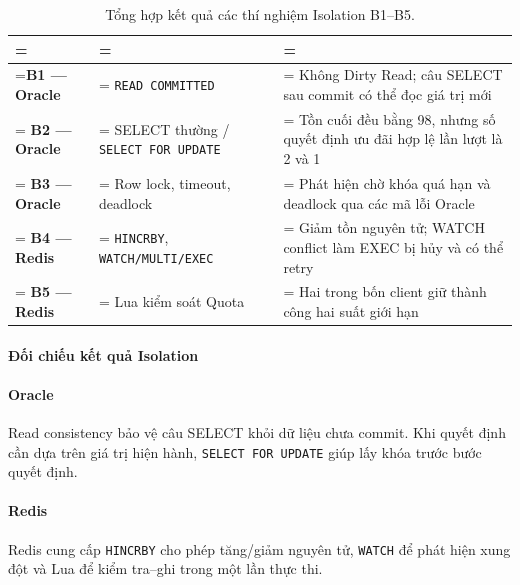 \begin{table}[!htbp]
\centering
\caption{Tổng hợp kết quả các thí nghiệm Isolation B1–B5.}\label{tab:tx-13}
\reporttablesetup
\begin{tabularx}{\linewidth}{|>{\hsize\linewidth=\hsize}L|>{\hsize\linewidth=\hsize}L|>{\hsize\linewidth=\hsize}L|}
\hline
{}
 &  &  \\ \hline
\textbf{B1 — Oracle} & \texttt{READ COMMITTED} & Không Dirty Read; câu SELECT sau commit có thể đọc giá trị mới \\ \hline
\textbf{B2 — Oracle} & SELECT thường / \texttt{SELECT FOR UPDATE} & Tồn cuối đều bằng 98, nhưng số quyết định ưu đãi hợp lệ lần lượt là 2 và 1 \\ \hline
\textbf{B3 — Oracle} & Row lock, timeout, deadlock & Phát hiện chờ khóa quá hạn và deadlock qua các mã lỗi Oracle \\ \hline
\textbf{B4 — Redis} & \texttt{HINCRBY}, \texttt{WATCH/\allowbreak{}MULTI/\allowbreak{}EXEC} & Giảm tồn nguyên tử; WATCH conflict làm EXEC bị hủy và có thể retry \\ \hline
\textbf{B5 — Redis} & Lua kiểm soát Quota & Hai trong bốn client giữ thành công hai suất giới hạn \\ \hline
\end{tabularx}
\end{table}
\paragraph*{Đối chiếu kết quả Isolation}

\paragraph*{Oracle}

Read consistency bảo vệ câu SELECT khỏi dữ liệu chưa commit. Khi quyết định cần dựa trên giá trị hiện hành, \texttt{SELECT FOR UPDATE} giúp lấy khóa trước bước quyết định.

\paragraph*{Redis}

Redis cung cấp \texttt{HINCRBY} cho phép tăng/giảm nguyên tử, \texttt{WATCH} để phát hiện xung đột và Lua để kiểm tra–ghi trong một lần thực thi.


